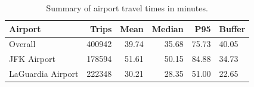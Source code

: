 \begin{table}
\caption{Summary of airport travel times in minutes.}
\label{tab:travel-time-summary}
\begin{tabular}{lrrrr}
\toprule
Airport & Trips & Mean & Median & P95 & Buffer \\
\midrule
Overall & 400942 & 39.74 & 35.68 & 75.73 & 40.05 \\
JFK Airport & 178594 & 51.61 & 50.15 & 84.88 & 34.73 \\
LaGuardia Airport & 222348 & 30.21 & 28.35 & 51.00 & 22.65 \\
\bottomrule
\end{tabular}
\end{table}
